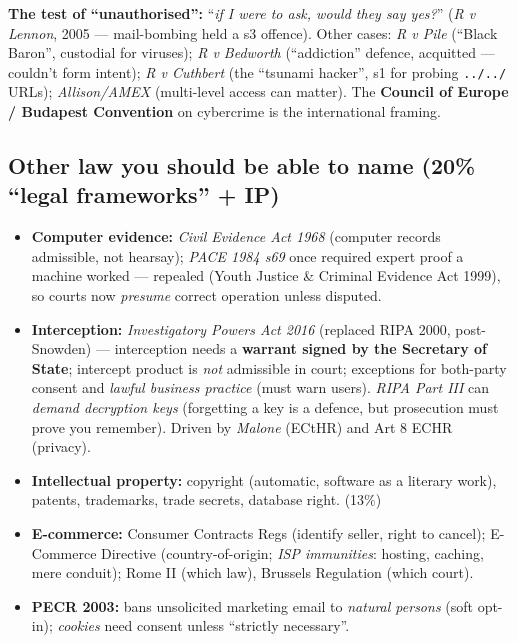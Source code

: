 \documentclass[11pt,a4paper]{article}
\begin{document}
\begin{useful}
\textbf{The test of ``unauthorised'':} ``\emph{if I were to ask, would they say yes?}'' (\emph{R v Lennon}, 2005 --- mail-bombing held a s3 offence). Other cases: \emph{R v Pile} (``Black Baron'', custodial for viruses); \emph{R v Bedworth} (``addiction'' defence, acquitted --- couldn't form intent); \emph{R v Cuthbert} (the ``tsunami hacker'', s1 for probing \texttt{../../} URLs); \emph{Allison/AMEX} (multi-level access can matter). The \textbf{Council of Europe / Budapest Convention} on cybercrime is the international framing.
\end{useful}

\subsection{Other law you should be able to name (20\% ``legal frameworks'' + IP)}

\begin{useful}
\begin{itemize}[leftmargin=*,itemsep=1pt]
  \item \textbf{Computer evidence:} \emph{Civil Evidence Act 1968} (computer records admissible, not hearsay); \emph{PACE 1984 s69} once required expert proof a machine worked --- repealed (Youth Justice \& Criminal Evidence Act 1999), so courts now \emph{presume} correct operation unless disputed.
  \item \textbf{Interception:} \emph{Investigatory Powers Act 2016} (replaced RIPA 2000, post-Snowden) --- interception needs a \textbf{warrant signed by the Secretary of State}; intercept product is \emph{not} admissible in court; exceptions for both-party consent and \emph{lawful business practice} (must warn users). \emph{RIPA Part III} can \emph{demand decryption keys} (forgetting a key is a defence, but prosecution must prove you remember). Driven by \emph{Malone} (ECtHR) and Art 8 ECHR (privacy).
  \item \textbf{Intellectual property:} copyright (automatic, software as a literary work), patents, trademarks, trade secrets, database right. (13\%)
  \item \textbf{E-commerce:} Consumer Contracts Regs (identify seller, right to cancel); E-Commerce Directive (country-of-origin; \emph{ISP immunities}: hosting, caching, mere conduit); Rome II (which law), Brussels Regulation (which court).
  \item \textbf{PECR 2003:} bans unsolicited marketing email to \emph{natural persons} (soft opt-in); \emph{cookies} need consent unless ``strictly necessary''.
\end{itemize}
\end{useful}
\end{document}
